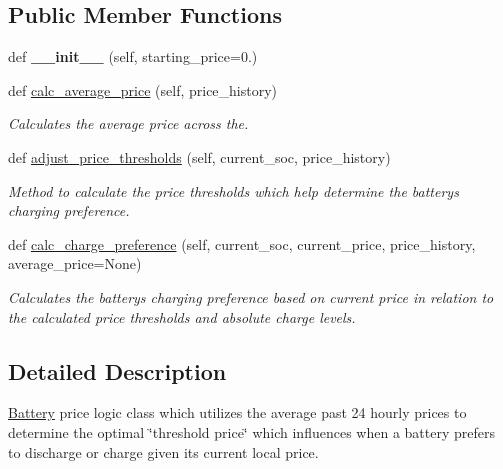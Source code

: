 \subsection*{Public Member Functions}
\begin{DoxyCompactItemize}
\item 
\mbox{\label{class_build_1_1_objects_1_1battery_1_1_battery_price_logic_a_a0134a6435cd19197d759260aef5b7f37}} 
def {\bfseries \+\_\+\+\_\+init\+\_\+\+\_\+} (self, starting\+\_\+price=0.)
\item 
\mbox{\label{class_build_1_1_objects_1_1battery_1_1_battery_price_logic_a_af0520a01ff896c884f8fbdd241c560ab}} 
def \hyperlink{class_build_1_1_objects_1_1battery_1_1_battery_price_logic_a_af0520a01ff896c884f8fbdd241c560ab}{calc\+\_\+average\+\_\+price} (self, price\+\_\+history)
\begin{DoxyCompactList}\small\item\em Calculates the average price across the. \end{DoxyCompactList}\item 
def \hyperlink{class_build_1_1_objects_1_1battery_1_1_battery_price_logic_a_a2253d32097370a29c9110248042dbc86}{adjust\+\_\+price\+\_\+thresholds} (self, current\+\_\+soc, price\+\_\+history)
\begin{DoxyCompactList}\small\item\em Method to calculate the price thresholds which help determine the battery\textquotesingle{}s charging preference. \end{DoxyCompactList}\item 
def \hyperlink{class_build_1_1_objects_1_1battery_1_1_battery_price_logic_a_a958d6290df78fa626a89c2ee74c5764b}{calc\+\_\+charge\+\_\+preference} (self, current\+\_\+soc, current\+\_\+price, price\+\_\+history, average\+\_\+price=None)
\begin{DoxyCompactList}\small\item\em Calculates the battery\textquotesingle{}s charging preference based on current price in relation to the calculated price thresholds and absolute charge levels. \end{DoxyCompactList}\end{DoxyCompactItemize}


\subsection{Detailed Description}
\hyperlink{class_build_1_1_objects_1_1battery_1_1_battery}{Battery} price logic class which utilizes the average past 24 hourly prices to determine the optimal \char`\"{}threshold price\char`\"{} which influences when a battery prefers to discharge or charge given its current local price. 



